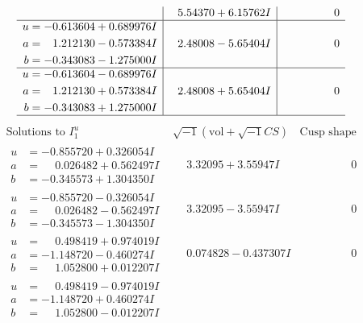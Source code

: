 \documentclass[1p]{elsarticle_modified}
\theoremstyle{definition}
\newcommand{\I}{\sqrt{-1}}
\begin{document}
$$\begin{array}{c|c|c}
 & \phantom{-}5.54370 + 6.15762 I & \phantom{-0.000000 } 0 \\ \hline\begin{aligned}
u &= -0.613604 + 0.689976 I \\
a &= \phantom{-}1.212130 - 0.573384 I \\
b &= -0.343083 - 1.275000 I\end{aligned}
 & \phantom{-}2.48008 - 5.65404 I & \phantom{-0.000000 } 0 \\ \hline\begin{aligned}
u &= -0.613604 - 0.689976 I \\
a &= \phantom{-}1.212130 + 0.573384 I \\
b &= -0.343083 + 1.275000 I\end{aligned}
 & \phantom{-}2.48008 + 5.65404 I & \phantom{-0.000000 } 0\\
 \hline 
 \end{array}$$\newpage$$\begin{array}{c|c|c}  
\text{Solutions to }I^u_{1}& \I (\text{vol} + \sqrt{-1}CS) & \text{Cusp shape}\\
 \hline 
\begin{aligned}
u &= -0.855720 + 0.326054 I \\
a &= \phantom{-}0.026482 + 0.562497 I \\
b &= -0.345573 + 1.304350 I\end{aligned}
 & \phantom{-}3.32095 + 3.55947 I & \phantom{-0.000000 } 0 \\ \hline\begin{aligned}
u &= -0.855720 - 0.326054 I \\
a &= \phantom{-}0.026482 - 0.562497 I \\
b &= -0.345573 - 1.304350 I\end{aligned}
 & \phantom{-}3.32095 - 3.55947 I & \phantom{-0.000000 } 0 \\ \hline\begin{aligned}
u &= \phantom{-}0.498419 + 0.974019 I \\
a &= -1.148720 - 0.460274 I \\
b &= \phantom{-}1.052800 + 0.012207 I\end{aligned}
 & \phantom{-}0.074828 - 0.437307 I & \phantom{-0.000000 } 0 \\ \hline\begin{aligned}
u &= \phantom{-}0.498419 - 0.974019 I \\
a &= -1.148720 + 0.460274 I \\
b &= \phantom{-}1.052800 - 0.012207 I\end{aligned}

\end{array}$$
\end{document}

